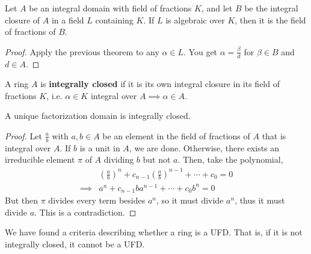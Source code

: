 \documentclass[12pt]{amsart}
\begin{document}
\begin{corollary}
    Let $A$ be an integral domain with field of fractions $K$, and let $B$ be the integral closure of $A$ in a field $L$ containing $K$. If $L$ is algebraic over $K$, then it is the field of fractions of $B$.  
\end{corollary}
\begin{proof}
    Apply the previous theorem to any $\alpha \in L$. You get $\alpha = \frac{\beta}{d}$ for $\beta \in B$ and $d \in A$. 
\end{proof}

\begin{definition}
    A ring $A$ is \textbf{integrally closed} if it is its own integral closure in its field of fractions $K$, i.e. $\alpha \in K$ integral over $A \implies \alpha \in A$. 
\end{definition}

\begin{proposition}
    A unique factorization domain is integrally closed. 
\end{proposition}
\begin{proof}
    Let $\frac{a}{b}$ with $a,b \in A$ be an element in the field of fractions of $A$ that is integral over $A$. If $b$ is a unit in $A$, we are done. Otherwise, there exists an irreducible element $\pi$ of $A$ dividing $b$ but not $a$. Then, take the polynomial, 
    \begin{align*}
        &\left(\frac{a}{b}\right)^n + c_{n-1}\left(\frac{a}{b}\right)^{n-1} +\cdots + c_0 = 0 \\ 
        \implies &a^n + c_{n-1}ba^{n-1} + \cdots + c_0b^n = 0
    \end{align*} 
    But then $\pi$ divides every term besides $a^n$, so it must divide $a^n$, thus it must divide $a$. This is a contradiction. 
\end{proof}

\begin{remark}
    We have found a criteria describing whether a ring is a UFD. That is, if it is not integrally closed, it cannot be a UFD.
\end{remark} 
\end{document}
